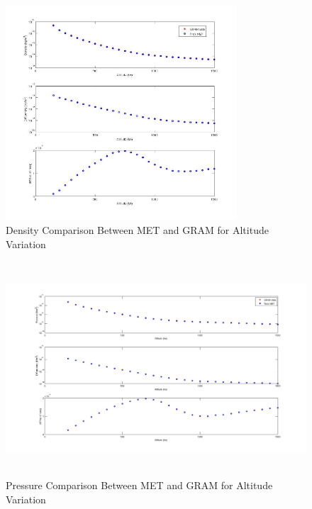 \begin{description}
\begin{figure}[H]
\begin{center}
\includegraphics[height=80mm]{pics/MET_GRA_T01_density.jpg}
\caption{Density Comparison Between MET and GRAM for Altitude Variation}
\label{met_gram_alt_dens}
\end{center}
\end{figure}

\begin{figure}[H]
\begin{center}
\includegraphics[height=80mm]{pics/MET_GRA_T01_pressure.jpg}
\caption{Pressure Comparison Between MET and GRAM for Altitude Variation}
\label{met_gram_alt_press}
\end{center}
\end{figure}


\end{description}
